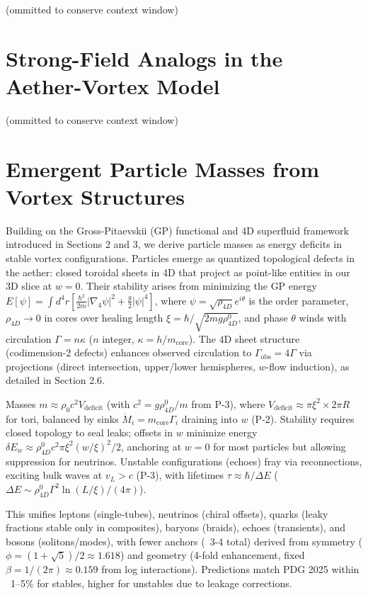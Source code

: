 \documentclass{article}
\begin{document}
(ommitted to conserve context window)

\section{Strong-Field Analogs in the Aether-Vortex Model}

(ommitted to conserve context window)

\section{Emergent Particle Masses from Vortex Structures}

Building on the Gross-Pitaevskii (GP) functional and 4D superfluid framework introduced in Sections 2 and 3, we derive particle masses as energy deficits in stable vortex configurations. Particles emerge as quantized topological defects in the aether: closed toroidal sheets in 4D that project as point-like entities in our 3D slice at $w=0$. Their stability arises from minimizing the GP energy $E[\psi] = \int d^4 r \left[ \frac{\hbar^2}{2 m} |\nabla_4 \psi|^2 + \frac{g}{2} |\psi|^4 \right]$, where $\psi = \sqrt{\rho_{4D}} e^{i \theta}$ is the order parameter, $\rho_{4D} \to 0$ in cores over healing length $\xi = \hbar / \sqrt{2 m g \rho_{4D}^0}$, and phase $\theta$ winds with circulation $\Gamma = n \kappa$ ($n$ integer, $\kappa = h / m_{\text{core}}$). The 4D sheet structure (codimension-2 defects) enhances observed circulation to $\Gamma_{\text{obs}} = 4\Gamma$ via projections (direct intersection, upper/lower hemispheres, $w$-flow induction), as detailed in Section 2.6.

Masses $m \approx \rho_0 c^2 V_{\text{deficit}}$ (with $c^2 = g \rho_{4D}^0 / m$ from P-3), where $V_{\text{deficit}} \approx \pi \xi^2 \times 2\pi R$ for tori, balanced by sinks $\dot{M}_i = m_{\text{core}} \Gamma_i$ draining into $w$ (P-2). Stability requires closed topology to seal leaks; offsets in $w$ minimize energy $\delta E_w \approx \rho_{4D}^0 c^2 \pi \xi^2 (w / \xi)^2 / 2$, anchoring at $w=0$ for most particles but allowing suppression for neutrinos. Unstable configurations (echoes) fray via reconnections, exciting bulk waves at $v_L > c$ (P-3), with lifetimes $\tau \approx \hbar / \Delta E$ ($\Delta E \sim \rho_{4D}^0 \Gamma^2 \ln(L / \xi) / (4\pi)$).

This unifies leptons (single-tubes), neutrinos (chiral offsets), quarks (leaky fractions stable only in composites), baryons (braids), echoes (transients), and bosons (solitons/modes), with fewer anchors (~3-4 total) derived from symmetry ($\phi = (1 + \sqrt{5})/2 \approx 1.618$) and geometry (4-fold enhancement, fixed $\beta = 1/(2\pi) \approx 0.159$ from log interactions). Predictions match PDG 2025 within ~1--5\% for stables, higher for unstables due to leakage corrections.
\end{document}
